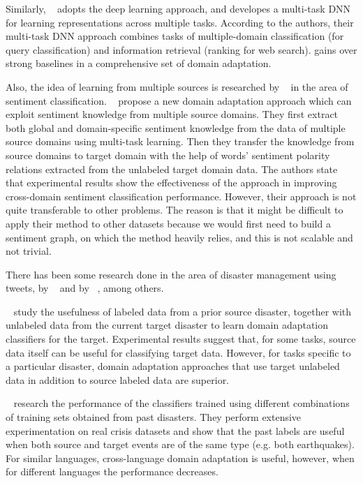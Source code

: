 Similarly, ~\citep{multitaskdeep} adopts the deep learning approach, and developes a multi-task DNN for learning representations across multiple tasks. According to the authors, their multi-task DNN approach combines tasks of multiple-domain classification (for query classification) and information retrieval (ranking for web search).
gains over strong baselines in a comprehensive set of domain adaptation.

Also, the idea of learning from multiple sources is researched by ~\citep{sentmulti} in the area of sentiment classification. ~\citep{sentmulti} propose a new domain adaptation approach which can exploit sentiment knowledge from multiple source domains. They first extract both global and domain-specific sentiment knowledge from the data of multiple source domains using multi-task learning. Then they transfer the knowledge from source domains to target domain with the help of words’ sentiment polarity relations extracted from the unlabeled target domain data. The authors state that experimental results show the effectiveness of the approach in improving cross-domain sentiment classification performance. However, their approach is not quite transferable to other problems. The reason is that it might be difficult to apply their method to other datasets because we would first need to build a sentiment graph, on which the method heavily relies, and this is not scalable and not trivial. 

There has been some research done in the area of disaster management using tweets, by ~\citep{twitterda} and by ~\citep{imran16}, among others. 

~\citep{twitterda} study the usefulness of labeled data from a prior source disaster, together with unlabeled data from the current target disaster to learn domain adaptation classifiers for the target. Experimental results suggest that, for some tasks, source data itself can be useful for classifying target data. However, for tasks specific to a particular disaster, domain adaptation approaches that use target unlabeled data in addition to source labeled data are superior.

~\citep{imran16} research the performance of the classifiers trained using different combinations of training sets obtained from past disasters. They perform extensive experimentation on real crisis datasets and show that the past 
labels are useful when both source and target events are of the same type (e.g. both earthquakes). For similar languages, cross-language domain adaptation is useful, however, when for different languages the performance decreases.

